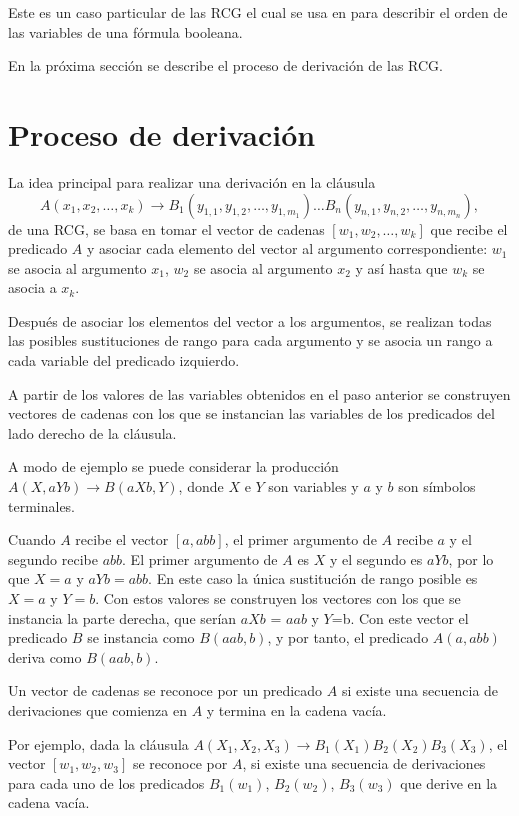 Este es un caso particular de las RCG el cual se usa en \cite{aSRCSAT} para describir el orden de las variables de una fórmula booleana. 

En la próxima sección se describe el proceso de derivación de las RCG.

\section{Proceso de derivación}

La idea principal para realizar una derivación en la cláusula 
\[
    A(x_1, x_2, \ldots, x_k) \to B_1(y_{1,1}, y_{1,2}, \ldots, y_{1,m_1}) \ldots B_n(y_{n,1}, y_{n,2}, \ldots, y_{n,m_n}),
\]
de una RCG, se basa en tomar el vector de cadenas $[w_1, w_2,\ldots, w_k]$ que recibe el predicado $A$ y asociar cada elemento del vector al argumento 
correspondiente: $w_1$ se asocia al argumento $x_1$, $w_2$ se asocia al argumento $x_2$ y así hasta que 
$w_k$ se asocia a $x_k$. 

Después de asociar los elementos del vector a los argumentos, se realizan todas las posibles sustituciones de rango para cada argumento y se asocia un rango a 
cada variable del predicado izquierdo.

A partir de los valores de las variables obtenidos en el paso anterior se construyen vectores de cadenas con los que se 
instancian las variables de los predicados del lado derecho de la cláusula.

A modo de ejemplo se puede considerar la producción $A(X,aYb)\to B(aXb,Y)$, donde $X$ e $Y$ son variables y $a$ y $b$ son símbolos terminales.

Cuando $A$ recibe el vector $[a,abb]$, el primer argumento de $A$ recibe $a$ y el segundo recibe $abb$.  El primer argumento de $A$ es $X$ y el segundo es $aYb$, por lo que $X=a$ y $aYb=abb$. En este caso la única sustitución de rango posible es $X=a$ y $Y=b$. Con estos valores se construyen los vectores con los que se instancia la parte derecha, que serían $aXb$ = $aab$ y $Y$=b. Con este vector el predicado $B$ se instancia como $B(aab,b)$, y por tanto, el predicado $A(a,abb)$ deriva como $B(aab,b)$.


Un vector de cadenas se reconoce por un predicado $A$ si existe una secuencia de derivaciones que comienza en $A$ y termina en la cadena vacía.

Por ejemplo, dada la cláusula $A(X_1,X_2,X_3)\to B_1(X_1)B_2(X_2)B_3(X_3)$, el vector $[w_1,w_2,w_3]$ se reconoce por $A$, si existe una secuencia de derivaciones para cada uno de los predicados $B_1(w_1)$, $B_2(w_2)$, $B_3(w_3)$ que derive en la cadena vacía.

